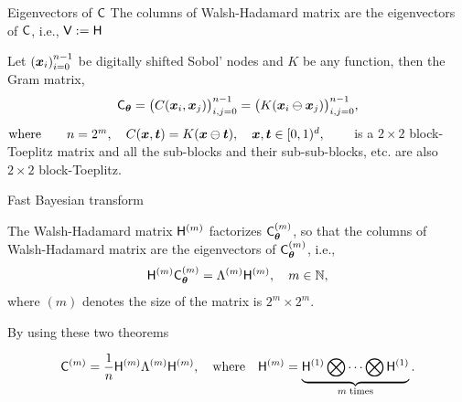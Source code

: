 \documentclass[handout, 10pt,compress,xcolor={usenames,dvipsnames}]{beamer} %
\newcommand{\bm}[1]{\boldsymbol{#1}}
\renewcommand{\mLambda}{\Lambda}
\newcommand{\mCtheta}{\mC_{\vtheta}}
\renewcommand{\vtheta}{{\bm{\theta}}}
\begin{document}
\begin{frame}{Eigenvectors of $\mathsf{C}$}
	\vspace{-2ex}
	The columns of Walsh-Hadamard matrix are the eigenvectors of $\mathsf{C}$, i.e., $\mathsf{V} := \mathsf{H}$
\begin{theorem}
	\label{thrm:block-toeplitz}
	Let $\left(\boldsymbol{x}_i\right)_{i=0}^{n-1}$ be digitally shifted Sobol' nodes and $K$ be any function,
	then the Gram matrix,
	\vspace{-1ex}
	$$
	\mCtheta = \bigl(C(\vx_i, \vx_j)\bigr)_{i,j=0}^{n-1} = \bigl(K(\vx_i \ominus \vx_j)\bigr)_{i,j=0}^{n-1},
	$$   
	$\text{where} \quad \quad n=2^m, \quad C(\boldsymbol{x}, \boldsymbol{t}) = K(\boldsymbol{x} \ominus \boldsymbol{t}), \quad  \boldsymbol{x}, \boldsymbol{t} \in [0,1)^d, \qquad
	$
	is a $2\times 2$ block-Toeplitz matrix and all the sub-blocks and their sub-sub-blocks, etc. are also $2\times 2$ block-Toeplitz. 
\end{theorem}


\end{frame}







\begin{frame}{Fast Bayesian transform}
	
	
	\begin{theorem}
		\label{thrm:hadamard_eigenvector}
		The Walsh-Hadamard matrix $\mathsf{H}^{(m)}$ factorizes $\mC_{\vtheta}^{(m)}$, so that the columns of Walsh-Hadamard matrix are the eigenvectors of $\mC_{\vtheta}^{(m)}$, i.e.,
		\vspace{-2ex}
		\begin{align*}
		\mH^{(m)} \mC_{\vtheta}^{(m)}  = \mLambda^{(m)} \mH^{(m)}, \quad m \in \naturals, 
		\end{align*}
		where $(m)$ denotes the size of the matrix is $2^m \times 2^m$.
	\end{theorem}

	By using these two theorems
	
	\begin{align}
	\label{eqn:hadamard_fwht}
	\mC^{(m)} = \frac{1}{n} \mH^{(m)} \mLambda^{(m)} \mH^{(m)}, \quad \text{where} \quad \mH^{({m})} = \underbrace{ \mH^{(1)} \bigotimes \cdots \bigotimes \mH^{(1)} }_{m \; \text{times}}.
	\end{align}
\end{frame}
\end{document}
